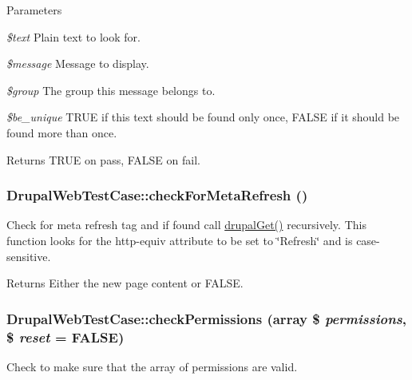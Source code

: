 \begin{DoxyParams}{Parameters}
\item[{\em \$text}]Plain text to look for. \item[{\em \$message}]Message to display. \item[{\em \$group}]The group this message belongs to. \item[{\em \$be\_\-unique}]TRUE if this text should be found only once, FALSE if it should be found more than once. \end{DoxyParams}
\begin{DoxyReturn}{Returns}
TRUE on pass, FALSE on fail. 
\end{DoxyReturn}
\hypertarget{class_drupal_web_test_case_a639bf5d4e0892c7d3659c224a609183c}{
\subsubsection[{checkForMetaRefresh}]{\setlength{\rightskip}{0pt plus 5cm}DrupalWebTestCase::checkForMetaRefresh ()}}
\label{class_drupal_web_test_case_a639bf5d4e0892c7d3659c224a609183c}
Check for meta refresh tag and if found call \hyperlink{class_drupal_web_test_case_ae282e9e10195fb8dad8a49d1b35e31c9}{drupalGet()} recursively. This function looks for the http-\/equiv attribute to be set to \char`\"{}Refresh\char`\"{} and is case-\/sensitive.

\begin{DoxyReturn}{Returns}
Either the new page content or FALSE. 
\end{DoxyReturn}
\hypertarget{class_drupal_web_test_case_a12e53962cb95e9f6eb86efcc09b08615}{
\subsubsection[{checkPermissions}]{\setlength{\rightskip}{0pt plus 5cm}DrupalWebTestCase::checkPermissions (array \$ {\em permissions}, \/  \$ {\em reset} = {\ttfamily FALSE})}}
\label{class_drupal_web_test_case_a12e53962cb95e9f6eb86efcc09b08615}
Check to make sure that the array of permissions are valid.



